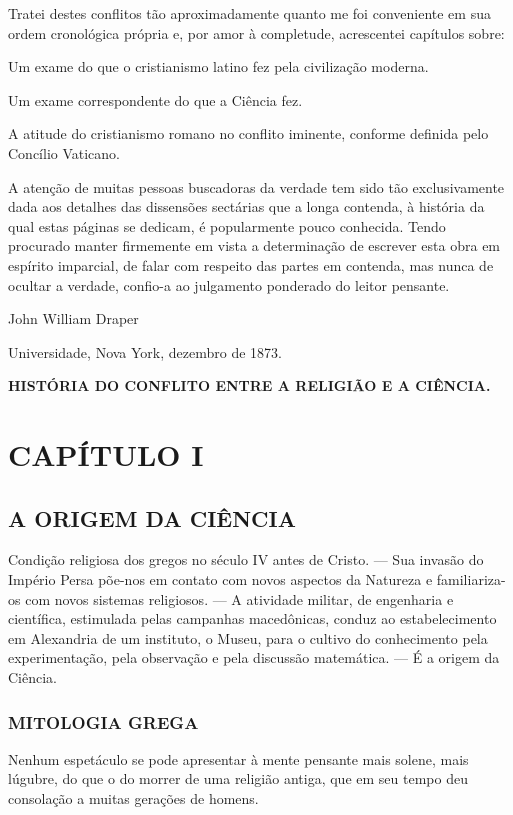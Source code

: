 \documentclass[11pt,a5paper,twoside,openany]{book}
\begin{document}
Tratei destes conflitos tão aproximadamente quanto me foi conveniente em sua ordem cronológica própria e, por amor à completude, acrescentei capítulos sobre:

Um exame do que o cristianismo latino fez pela civilização moderna.

Um exame correspondente do que a Ciência fez.

A atitude do cristianismo romano no conflito iminente, conforme definida pelo Concílio Vaticano.

A atenção de muitas pessoas buscadoras da verdade tem sido tão exclusivamente dada aos detalhes das dissensões sectárias que a longa contenda, à história da qual estas páginas se dedicam, é popularmente pouco conhecida. Tendo procurado manter firmemente em vista a determinação de escrever esta obra em espírito imparcial, de falar com respeito das partes em contenda, mas nunca de ocultar a verdade, confio-a ao julgamento ponderado do leitor pensante.

John William Draper

Universidade, Nova York, dezembro de 1873.

\par\medskip\noindent\hrulefill\par\medskip
\textbf{HISTÓRIA DO CONFLITO ENTRE A RELIGIÃO E A CIÊNCIA.}

\clearpage
\chapter*{CAPÍTULO I}
\section*{A ORIGEM DA CIÊNCIA}
Condição religiosa dos gregos no século IV antes de Cristo. — Sua invasão do Império Persa põe-nos em contato com novos aspectos da Natureza e familiariza-os com novos sistemas religiosos. — A atividade militar, de engenharia e científica, estimulada pelas campanhas macedônicas, conduz ao estabelecimento em Alexandria de um instituto, o Museu, para o cultivo do conhecimento pela experimentação, pela observação e pela discussão matemática. — É a origem da Ciência.

\subsection*{MITOLOGIA GREGA}
Nenhum espetáculo se pode apresentar à mente pensante mais solene, mais lúgubre, do que o do morrer de uma religião antiga, que em seu tempo deu consolação a muitas gerações de homens.
\end{document}
